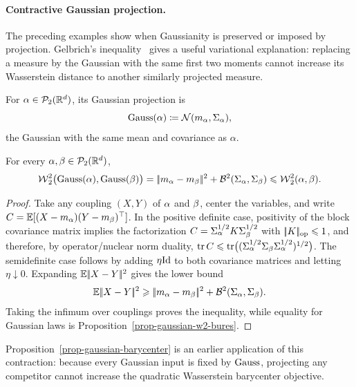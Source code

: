 \paragraph{Contractive Gaussian projection.}

The preceding examples show when Gaussianity is preserved or imposed by projection. Gelbrich's inequality~\cite{gelbrich1990formula} gives a useful variational explanation: replacing a measure by the Gaussian with the same first two moments cannot increase its Wasserstein distance to another similarly projected measure.

\begin{defn}\label{def-gaussian-projection}
For \(\alpha\in\mathcal{P}_2(\mathbb{R}^d)\), its Gaussian projection is
\[
	\operatorname{Gauss}(\alpha)
	\coloneqq
	\mathcal{N}(m_\alpha,\Sigma_\alpha),
\]
the Gaussian with the same mean and covariance as \(\alpha\).
\end{defn}

\begin{thm}\label{thm-gelbrich-projection}
	For every $\alpha,\beta\in\mathcal{P}_2(\mathbb{R}^d)$,
	\[
		\operatorname{\mathcal{W}}_2^2\bigl(\operatorname{Gauss}(\alpha),\operatorname{Gauss}(\beta)\bigr)
		=
		|\!| m_\alpha-m_\beta |\!|^2+\mathcal{B}^2(\Sigma_\alpha,\Sigma_\beta)
		\leqslant
		\operatorname{\mathcal{W}}_2^2(\alpha,\beta).
	\]
\end{thm}

\begin{proof}
	Take any coupling $(X,Y)$ of $\alpha$ and $\beta$, center the variables, and write $C=\mathbb{E}[(X-m_\alpha)(Y-m_\beta)^\top]$. In the positive definite case, positivity of the block covariance matrix implies the factorization $C=\Sigma_\alpha^{1/2}K\Sigma_\beta^{1/2}$ with $|\!| K |\!|_{\mathrm{op}}\leqslant1$, and therefore, by operator/nuclear norm duality, $\operatorname{tr} C\leqslant \operatorname{tr}\bigl((\Sigma_\alpha^{1/2}\Sigma_\beta\Sigma_\alpha^{1/2})^{1/2}\bigr)$.
	The semidefinite case follows by adding $\eta\mathrm{Id}$ to both covariance matrices and letting $\eta\downarrow0$.
	Expanding $\mathbb{E}|\!| X-Y |\!|^2$ gives the lower bound
	\[
		\mathbb{E}|\!| X-Y |\!|^2
		\geqslant
		|\!| m_\alpha-m_\beta |\!|^2+\mathcal{B}^2(\Sigma_\alpha,\Sigma_\beta).
	\]
	Taking the infimum over couplings proves the inequality, while equality for Gaussian laws is Proposition~\ref{prop-gaussian-w2-bures}.
\end{proof}

Proposition~\ref{prop-gaussian-barycenter} is an earlier application of this contraction: because every Gaussian input is fixed by $\operatorname{Gauss}$, projecting any competitor cannot increase the quadratic Wasserstein barycenter objective.

